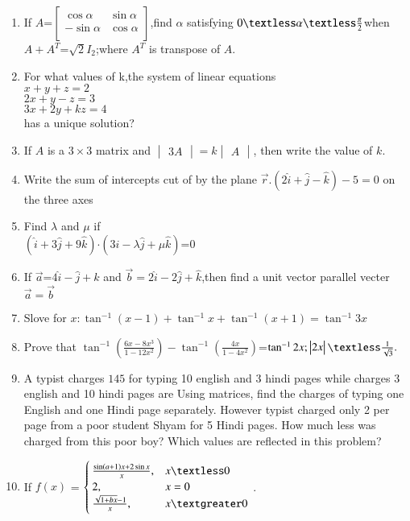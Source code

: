 \documentclass[12pt,-letter paper]{article}
\providecommand{\mydet}[1]{\ensuremath{\begin{vmatrix}#1\end{vmatrix}}}
\providecommand{\myvec}[1]{\ensuremath{\begin{bmatrix}#1\end{bmatrix}}}
\providecommand{\brak}[1]{\ensuremath{\left(#1\right)}}
\begin{document}
\begin{enumerate}
	\item If $A$=$\myvec{
			\cos\alpha&\sin\alpha\\
			-\sin\alpha&\cos\alpha\\
			}$,find $\alpha$ satisfying $0\textless\alpha\textless\frac{\pi}{2}$when $A+A^T$=$\sqrt{2}$$I_{2}$;where $A^T$ is transpose of $A$.
	\item For what values of k,the system of linear equations\\
		$x+y+z=2$\\
		$2x+y-z=3$\\
		$3x+2y+kz=4$\\
		has a unique solution?
	
	\item If $A$ is a $3\times 3$ matrix and $\mydet{3A}=k\mydet{A}$, then write the value of $k$.
	\item Write the sum of intercepts cut of by the plane $\overset\rightarrow{r}.\brak{2\hat{i}+\hat{j}-\hat{k}}-5=0$ on the three axes

\item Find $\lambda$ and $\mu$ if\\
	$\brak{\hat{i}+3\hat{j}+9\hat{k}}$$\cdot$$\brak{3\hat{i}-\lambda\hat{j}+\mu\hat{k}}$=$0$
	
\item If $\overset\rightarrow{a}$=$4\hat{i}-\hat{j}+\hat{k}$ and $\overset\rightarrow{b}=2\hat{i}-2\hat{j}+\hat{k}$,then find a unit vector parallel vecter $\overset\rightarrow{a}=\overset\rightarrow{b}$


		
\item Slove for $x:\tan^{-1}\brak{x-1}+\tan^{-1} x+\tan^{-1}\brak{x+1}=\tan^{-1}3x$\\
		
\item	Prove that $\tan^{-1}\brak{\frac{6x-8x^3}{1-12x^2}}-\tan^{-1}\brak{\frac{4x}{1-4x^2}}$=$\tan^{-1}2x;\mydet{2x}\textless\frac{1}{\sqrt{3}}.$
	\item A typist charges \rupee $145$ for typing 10 english and 3 hindi pages while charges 3 english and 10 hindi pages are  Using matrices, find the charges of typing one English and one Hindi page separately. However typist charged only 2 per page from a poor student Shyam for 5 Hindi pages. How much less was charged from this poor boy? Which values are reflected in this problem?

	\item  If  $f\brak{x}$ = $\begin{cases}
			\frac{\sin\brak{a+1}x + 2\sin x}{x}, & x \textless 0 \\
   2, & x = 0 \\
   \frac{\sqrt{1+bx} - 1}{x}, & x \textgreater 0
    \end{cases}$
	.
	

\end{enumerate}
\end{document}
